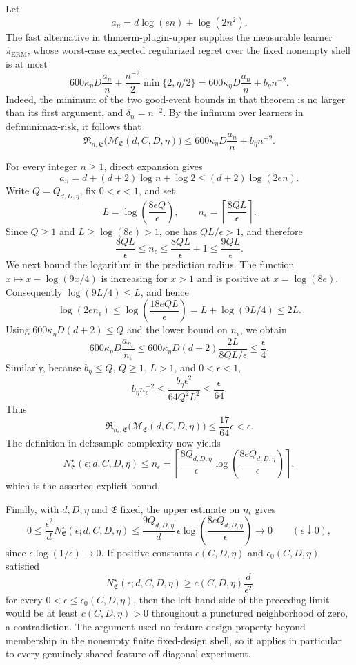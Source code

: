 Let
\[
a_n=d\log(en)+\log(2n^2).
\]
The fast alternative in \(\text{thm:erm-plugin-upper}\) supplies the measurable learner \(\widehat\pi_{\mathrm{ERM}}\), whose worst-case expected regularized regret over the fixed nonempty shell is at most
\[
600\kappa_\eta D\frac{a_n}{n}+\frac{n^{-2}}2\min\{2,\eta/2\}
=600\kappa_\eta D\frac{a_n}{n}+b_\eta n^{-2}.
\]
Indeed, the minimum of the two good-event bounds in that theorem is no larger than its first argument, and \(\delta_n=n^{-2}\). By the infimum over learners in \(\text{def:minimax-risk}\), it follows that
\[
\mathfrak R_{n,\mathfrak E}\bigl(\mathcal M_{\mathfrak E}(d,C,D,\eta)\bigr)
\le 600\kappa_\eta D\frac{a_n}{n}+b_\eta n^{-2}.
\]

For every integer \(n\ge1\), direct expansion gives
\[
a_n=d+(d+2)\log n+\log2
\le(d+2)\log(2en).
\]
Write \(Q=Q_{d,D,\eta}\), fix \(0<\epsilon<1\), and set
\[
L=\log\!\left(\frac{8eQ}{\epsilon}\right),
\qquad
n_\epsilon=\left\lceil\frac{8QL}{\epsilon}\right\rceil.
\]
Since \(Q\ge1\) and \(L\ge\log(8e)>1\), one has \(QL/\epsilon>1\), and therefore
\[
\frac{8QL}{\epsilon}\le n_\epsilon
\le\frac{8QL}{\epsilon}+1
\le\frac{9QL}{\epsilon}.
\]
We next bound the logarithm in the prediction radius. The function \(x\mapsto x-\log(9x/4)\) is increasing for \(x>1\) and is positive at \(x=\log(8e)\). Consequently \(\log(9L/4)\le L\), and hence
\[
\log(2en_\epsilon)
\le\log\!\left(\frac{18eQL}{\epsilon}\right)
=L+\log(9L/4)
\le2L.
\]
Using \(600\kappa_\eta D(d+2)\le Q\) and the lower bound on \(n_\epsilon\), we obtain
\[
600\kappa_\eta D\frac{a_{n_\epsilon}}{n_\epsilon}
\le600\kappa_\eta D(d+2)\frac{2L}{8QL/\epsilon}
\le\frac{\epsilon}{4}.
\]
Similarly, because \(b_\eta\le Q\), \(Q\ge1\), \(L>1\), and \(0<\epsilon<1\),
\[
b_\eta n_\epsilon^{-2}
\le\frac{b_\eta\epsilon^2}{64Q^2L^2}
\le\frac{\epsilon}{64}.
\]
Thus
\[
\mathfrak R_{n_\epsilon,\mathfrak E}
\bigl(\mathcal M_{\mathfrak E}(d,C,D,\eta)\bigr)
\le\frac{17}{64}\epsilon<\epsilon.
\]
The definition in \(\text{def:sample-complexity}\) now yields
\[
N^\star_{\mathfrak E}(\epsilon;d,C,D,\eta)
\le n_\epsilon
=\left\lceil\frac{8Q_{d,D,\eta}}{\epsilon}
\log\!\left(\frac{8eQ_{d,D,\eta}}{\epsilon}\right)\right\rceil,
\]
which is the asserted explicit bound.

Finally, with \(d,D,\eta\) and \(\mathfrak E\) fixed, the upper estimate on \(n_\epsilon\) gives
\[
0\le
\frac{\epsilon^2}{d}N^\star_{\mathfrak E}(\epsilon;d,C,D,\eta)
\le\frac{9Q_{d,D,\eta}}d\,\epsilon
\log\!\left(\frac{8eQ_{d,D,\eta}}{\epsilon}\right)
\longrightarrow0
\qquad(\epsilon\downarrow0),
\]
since \(\epsilon\log(1/\epsilon)\to0\). If positive constants \(c(C,D,\eta)\) and \(\epsilon_0(C,D,\eta)\) satisfied
\[
N^\star_{\mathfrak E}(\epsilon;d,C,D,\eta)
\ge c(C,D,\eta)\frac d{\epsilon^2}
\]
for every \(0<\epsilon\le\epsilon_0(C,D,\eta)\), then the left-hand side of the preceding limit would be at least \(c(C,D,\eta)>0\) throughout a punctured neighborhood of zero, a contradiction. The argument used no feature-design property beyond membership in the nonempty finite fixed-design shell, so it applies in particular to every genuinely shared-feature off-diagonal experiment.